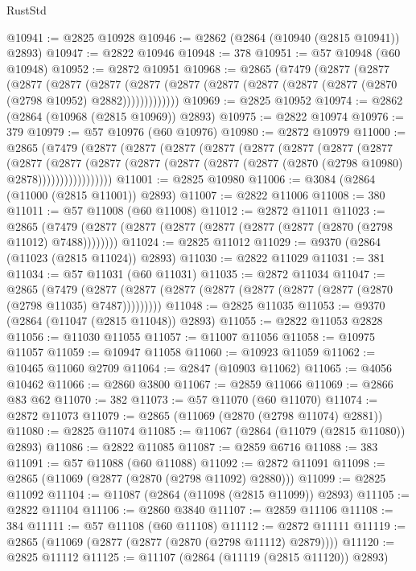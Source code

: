 \begin{lexlean}{RustStd}
\begin{coremodule}
@10941 := @2825 @10928
@10946 := @2862 (@2864 (@10940 (@2815 @10941)) @2893)
@10947 := @2822 @10946
@10948 := 378
@10951 := @57 @10948 (@60 @10948)
@10952 := @2872 @10951
@10968 := @2865
    (@7479
      (@2877
        (@2877
          (@2877
            (@2877
              (@2877
                (@2877 (@2877 (@2877 (@2877 (@2877 (@2877 (@2870 (@2798 @10952) @2882)))))))))))))
@10969 := @2825 @10952
@10974 := @2862 (@2864 (@10968 (@2815 @10969)) @2893)
@10975 := @2822 @10974
@10976 := 379
@10979 := @57 @10976 (@60 @10976)
@10980 := @2872 @10979
@11000 := @2865
    (@7479
      (@2877
        (@2877
          (@2877
            (@2877
              (@2877
                (@2877
                  (@2877
                    (@2877
                      (@2877
                        (@2877
                          (@2877
                            (@2877 (@2877 (@2877 (@2877 (@2870 (@2798 @10980) @2878)))))))))))))))))
@11001 := @2825 @10980
@11006 := @3084 (@2864 (@11000 (@2815 @11001)) @2893)
@11007 := @2822 @11006
@11008 := 380
@11011 := @57 @11008 (@60 @11008)
@11012 := @2872 @11011
@11023 := @2865 (@7479 (@2877 (@2877 (@2877 (@2877 (@2877 (@2877 (@2870 (@2798 @11012) @7488))))))))
@11024 := @2825 @11012
@11029 := @9370 (@2864 (@11023 (@2815 @11024)) @2893)
@11030 := @2822 @11029
@11031 := 381
@11034 := @57 @11031 (@60 @11031)
@11035 := @2872 @11034
@11047 := @2865
    (@7479 (@2877 (@2877 (@2877 (@2877 (@2877 (@2877 (@2877 (@2870 (@2798 @11035) @7487)))))))))
@11048 := @2825 @11035
@11053 := @9370 (@2864 (@11047 (@2815 @11048)) @2893)
@11055 := @2822 @11053 @2828
@11056 := @11030 @11055
@11057 := @11007 @11056
@11058 := @10975 @11057
@11059 := @10947 @11058
@11060 := @10923 @11059
@11062 := @10465 @11060 @2709
@11064 := @2847 (@10903 @11062)
@11065 := @4056 @10462
@11066 := @2860 @3800
@11067 := @2859 @11066
@11069 := @2866 @83 @62
@11070 := 382
@11073 := @57 @11070 (@60 @11070)
@11074 := @2872 @11073
@11079 := @2865 (@11069 (@2870 (@2798 @11074) @2881))
@11080 := @2825 @11074
@11085 := @11067 (@2864 (@11079 (@2815 @11080)) @2893)
@11086 := @2822 @11085
@11087 := @2859 @6716
@11088 := 383
@11091 := @57 @11088 (@60 @11088)
@11092 := @2872 @11091
@11098 := @2865 (@11069 (@2877 (@2870 (@2798 @11092) @2880)))
@11099 := @2825 @11092
@11104 := @11087 (@2864 (@11098 (@2815 @11099)) @2893)
@11105 := @2822 @11104
@11106 := @2860 @3840
@11107 := @2859 @11106
@11108 := 384
@11111 := @57 @11108 (@60 @11108)
@11112 := @2872 @11111
@11119 := @2865 (@11069 (@2877 (@2877 (@2870 (@2798 @11112) @2879))))
@11120 := @2825 @11112
@11125 := @11107 (@2864 (@11119 (@2815 @11120)) @2893)

\end{coremodule}
\end{lexlean}
